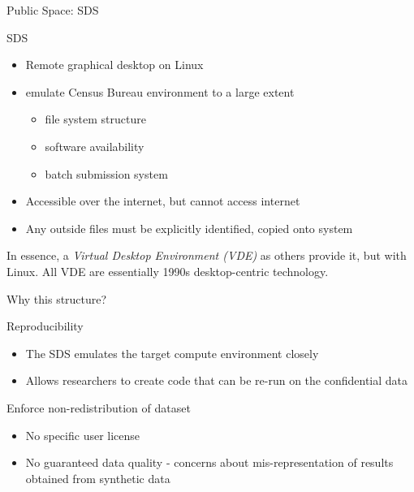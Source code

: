 \begin{frame}{Public Space: SDS}
	\begin{block}{\acf{SDS}}
\begin{itemize}
    \item Remote graphical desktop on Linux
    \item emulate Census Bureau environment  to a large extent
    \begin{itemize}
        \item file system structure
        \item software availability
        \item batch submission system
    \end{itemize}
	\item Accessible over the internet, but cannot access internet
    \item Any outside files must be explicitly identified, copied onto system
\end{itemize}\end{block}
\footnotesize In essence, a \textit{Virtual Desktop Environment (VDE)} as others provide it, but with Linux. All VDE are essentially 1990s desktop-centric technology.
\end{frame}

\begin{frame}{Why this structure?}
\begin{block}{Reproducibility}
	\begin{itemize}
		\item The \ac{SDS} emulates the target compute environment closely
		\item Allows researchers to create code that can be re-run on the confidential data
\end{itemize}\end{block}

\begin{block}{Enforce non-redistribution of dataset}
	\begin{itemize}
		\item No specific user license
		\item No guaranteed data quality - concerns about mis-representation of results obtained from synthetic data
	\end{itemize}
\end{block}
\end{frame}




